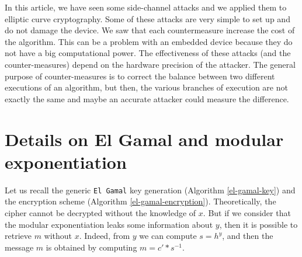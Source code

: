 \documentclass[journal]{IEEEtran}
\begin{document}
In this article, we have seen some side-channel attacks and we applied them to elliptic curve cryptography. Some of these attacks are very simple to set up and do not damage the device. We saw that each countermeasure increase the cost of the algorithm. This can be a problem with an embedded device because they do not have a big computational power. The effectiveness of these attacks (and the counter-measures) depend on the hardware precision of the attacker. The general purpose of counter-measures is to correct the balance between two different executions of an algorithm, but then, the various branches of execution are not exactly the same and maybe an accurate attacker could measure the difference.

\clearpage




%


\appendices
\section{Details on El Gamal and modular exponentiation}
\label{ElGamal}
Let us recall the generic {\tt El Gamal} key generation (Algorithm \ref{el-gamal-key})
and the encryption scheme (Algorithm \ref{el-gamal-encryption}).
Theoretically, the cipher cannot be decrypted without the knowledge of $x$. But if we consider that
the modular exponentiation leaks some information about $y$, then it is possible to retrieve $m$ without $x$.
Indeed, from $y$ we can compute $s = h^y$, and then the message $m$ is obtained by computing $m = c' * s^{-1}$.
\end{document}
